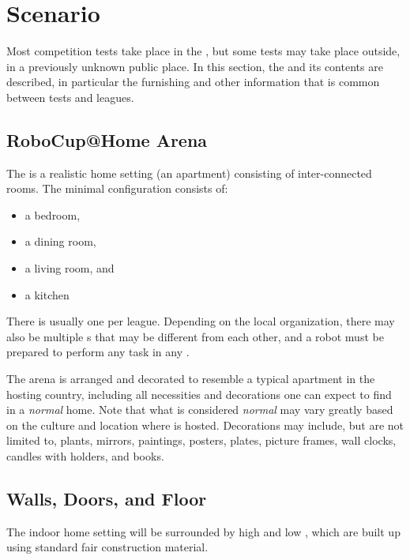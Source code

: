 \section{Scenario}
\label{sec:scenario}

Most competition tests take place in the \RoboCup\AtHome\Arena, but some tests may take place outside, in a previously unknown public place.
In this section, the \Arena{} and its contents are described, in particular the furnishing and other information that is common between tests and leagues.

\subsection{RoboCup@Home Arena}

The \RoboCup\AtHome\Arena{} is a realistic home setting (an apartment) consisting of inter-connected rooms.
The minimal configuration consists of:
\begin{itemize}
	\item a bedroom,
	\item a dining room,
	\item a living room, and
	\item a kitchen
\end{itemize}
There is usually one \Arena{} per league.
Depending on the local organization, there may also be multiple \Arena{}s that may be different from each other, and a robot must be prepared to perform any task in any \Arena{}.

The arena is arranged and decorated to resemble a typical apartment in the hosting country, including all necessities and decorations one can expect to find in a \emph{normal} home.
Note that what is considered \emph{normal} may vary greatly based on the culture and location where \RoboCup{} is hosted.
Decorations may include, but are not limited to, plants, mirrors, paintings, posters, plates, picture frames, wall clocks, candles with holders, and books.

\subsection{Walls, Doors, and Floor}
\label{rule:scenario_walls}

The indoor home setting will be surrounded by high and low , which are built up using standard fair construction material.

